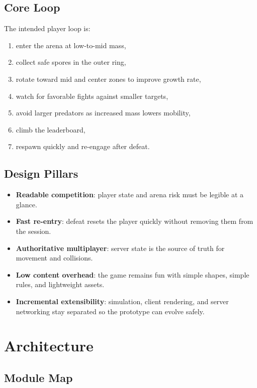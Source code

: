 \documentclass[11pt]{article}
\begin{document}
\subsection{Core Loop}

The intended player loop is:
\begin{enumerate}
  \item enter the arena at low-to-mid mass,
  \item collect safe spores in the outer ring,
  \item rotate toward mid and center zones to improve growth rate,
  \item watch for favorable fights against smaller targets,
  \item avoid larger predators as increased mass lowers mobility,
  \item climb the leaderboard,
  \item respawn quickly and re-engage after defeat.
\end{enumerate}

\subsection{Design Pillars}

\begin{itemize}
  \item \textbf{Readable competition}: player state and arena risk must be legible at a glance.
  \item \textbf{Fast re-entry}: defeat resets the player quickly without removing them from the session.
  \item \textbf{Authoritative multiplayer}: server state is the source of truth for movement and collisions.
  \item \textbf{Low content overhead}: the game remains fun with simple shapes, simple rules, and lightweight assets.
  \item \textbf{Incremental extensibility}: simulation, client rendering, and server networking stay separated so the prototype can evolve safely.
\end{itemize}

\section{Architecture}

\subsection{Module Map}
\end{document}
